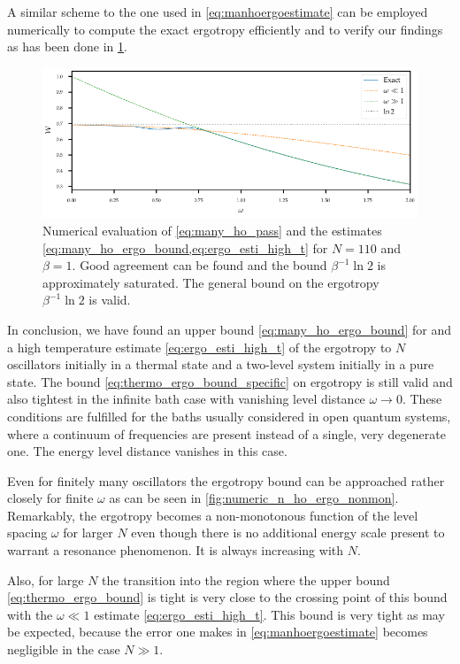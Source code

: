 A similar scheme to the one used in \cref{eq:manhoergoestimate} can be
employed numerically to compute the exact ergotropy efficiently and to verify our
findings as has been done in \cref{fig:numeric_n_ho_ergo}.
\begin{figure}[htp]
  \includegraphics{figs/ergo_calc/ergo_numeric}
  \caption{\label{fig:numeric_n_ho_ergo} Numerical evaluation of
    \cref{eq:many_ho_pass} and the estimates
    \cref{eq:many_ho_ergo_bound,eq:ergo_esti_high_t} for \(N=110\) and
    \(β=1\). Good agreement can be found and the bound \(β^{-1}\ln2\)
    is approximately saturated. The general bound on the ergotropy
    \(β^{-1}\ln2\) is valid.}
\end{figure}

In conclusion, we have found an upper bound
\cref{eq:many_ho_ergo_bound} for and a high temperature estimate
\cref{eq:ergo_esti_high_t} of the ergotropy to \(N\) oscillators
initially in a thermal state and a two-level system initially in a
pure state. The bound \cref{eq:thermo_ergo_bound_specific} on
ergotropy is still valid and also tightest in the infinite bath case
with vanishing level distance \(ω\to 0\). These conditions are
fulfilled for the baths usually considered in open quantum systems,
where a continuum of frequencies are present instead of a single, very
degenerate one. The energy level distance vanishes in this case.

Even for finitely many oscillators the ergotropy bound can be
approached rather closely for finite \(ω\) as can be seen in
\cref{fig:numeric_n_ho_ergo_nonmon}. Remarkably, the ergotropy becomes
a non-monotonous function of the level spacing \(ω\) for larger \(N\)
even though there is no additional energy scale present to warrant a
resonance phenomenon.  It is always increasing with \(N\).

Also, for large \(N\) the transition into the region where the upper
bound \cref{eq:thermo_ergo_bound} is tight is very close to the
crossing point of this bound with the \(ω\ll 1\) estimate
\cref{eq:ergo_esti_high_t}. This bound is very tight as may be
expected, because the error one makes in \cref{eq:manhoergoestimate}
becomes negligible in the case \(N\gg 1\).

